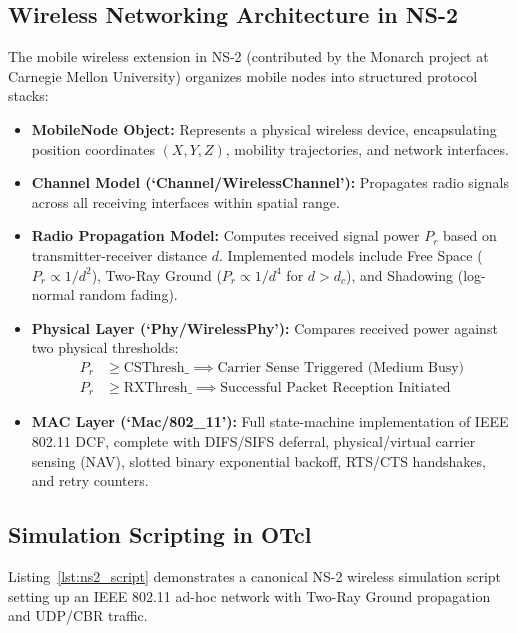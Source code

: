 \subsection{Wireless Networking Architecture in NS-2}
The mobile wireless extension in NS-2 (contributed by the Monarch project at Carnegie Mellon University) organizes mobile nodes into structured protocol stacks:
\begin{itemize}
    \item \textbf{MobileNode Object:} Represents a physical wireless device, encapsulating position coordinates $(X, Y, Z)$, mobility trajectories, and network interfaces.
    \item \textbf{Channel Model (`Channel/WirelessChannel'):} Propagates radio signals across all receiving interfaces within spatial range.
    \item \textbf{Radio Propagation Model:} Computes received signal power $P_r$ based on transmitter-receiver distance $d$. Implemented models include Free Space ($P_r \propto 1/d^2$), Two-Ray Ground ($P_r \propto 1/d^4$ for $d > d_c$), and Shadowing (log-normal random fading).
    \item \textbf{Physical Layer (`Phy/WirelessPhy'):} Compares received power against two physical thresholds:
    \begin{align}
        P_r &\ge \text{CSThresh\_} \implies \text{Carrier Sense Triggered (Medium Busy)} \\
        P_r &\ge \text{RXThresh\_} \implies \text{Successful Packet Reception Initiated}
    \end{align}
    \item \textbf{MAC Layer (`Mac/802\_11'):} Full state-machine implementation of IEEE 802.11 DCF, complete with DIFS/SIFS deferral, physical/virtual carrier sensing (NAV), slotted binary exponential backoff, RTS/CTS handshakes, and retry counters.
\end{itemize}

\subsection{Simulation Scripting in OTcl}
Listing~\ref{lst:ns2_script} demonstrates a canonical NS-2 wireless simulation script setting up an IEEE 802.11 ad-hoc network with Two-Ray Ground propagation and UDP/CBR traffic.

